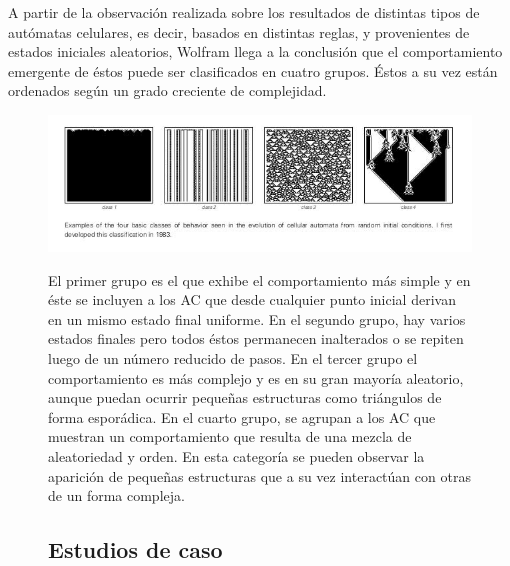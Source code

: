 \documentclass[16pt,spanish]{article}
\begin{document}
	A partir de la observación realizada sobre los resultados de distintas tipos de autómatas celulares, es decir, basados en distintas reglas, y provenientes de estados iniciales aleatorios, Wolfram llega a la conclusión que el comportamiento emergente de éstos puede ser clasificados en cuatro grupos. Éstos a su vez están ordenados según un grado creciente de complejidad.


\begin{figure}[h!]
	\includegraphics[width=\linewidth]{imagesCA/clasificacion.jpg}
	\caption{~\cite{wolfram2002new}}
\endfigure


	El primer grupo es el que exhibe el comportamiento más simple y en éste se incluyen a los AC que desde cualquier punto inicial derivan en un mismo estado final uniforme. 
	En el segundo grupo, hay varios estados finales pero todos éstos permanecen inalterados o se repiten luego de un número reducido de pasos. 
	En el tercer grupo el comportamiento es más complejo y es en su gran mayoría aleatorio, aunque puedan ocurrir pequeñas estructuras como triángulos de forma esporádica.
	En el cuarto grupo, se agrupan a los AC que muestran un comportamiento que resulta de una mezcla de aleatoriedad y orden. En esta categoría se pueden observar la aparición de pequeñas estructuras que a su vez interactúan con otras de un forma compleja.		

\subsection{Estudios de caso}
	

\end{figure}
\end{document}

